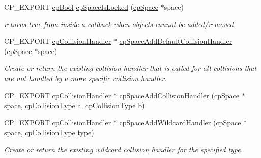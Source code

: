 \begin{DoxyCompactItemize}
\item 
\mbox{\label{group__cp_space_gad72c9085853f1d612226ec7b6faca362}} 
C\+P\+\_\+\+E\+X\+P\+O\+RT \mbox{\hyperlink{group__basic_types_gabc5e752c48f3449ca26ef413ecbd647e}{cp\+Bool}} \mbox{\hyperlink{group__cp_space_gad72c9085853f1d612226ec7b6faca362}{cp\+Space\+Is\+Locked}} (\mbox{\hyperlink{structcp_space}{cp\+Space}} $\ast$space)
\begin{DoxyCompactList}\small\item\em returns true from inside a callback when objects cannot be added/removed. \end{DoxyCompactList}\item 
\mbox{\label{group__cp_space_ga0ba809a2467c5e023738b9c5f72edda7}} 
C\+P\+\_\+\+E\+X\+P\+O\+RT \mbox{\hyperlink{structcp_collision_handler}{cp\+Collision\+Handler}} $\ast$ \mbox{\hyperlink{group__cp_space_ga0ba809a2467c5e023738b9c5f72edda7}{cp\+Space\+Add\+Default\+Collision\+Handler}} (\mbox{\hyperlink{structcp_space}{cp\+Space}} $\ast$space)
\begin{DoxyCompactList}\small\item\em Create or return the existing collision handler that is called for all collisions that are not handled by a more specific collision handler. \end{DoxyCompactList}\item 
C\+P\+\_\+\+E\+X\+P\+O\+RT \mbox{\hyperlink{structcp_collision_handler}{cp\+Collision\+Handler}} $\ast$ \mbox{\hyperlink{group__cp_space_ga54371fd2b5a430447dfc62826006a484}{cp\+Space\+Add\+Collision\+Handler}} (\mbox{\hyperlink{structcp_space}{cp\+Space}} $\ast$space, \mbox{\hyperlink{group__basic_types_gae83e2f50965eb441e36ffff1e32e6d02}{cp\+Collision\+Type}} a, \mbox{\hyperlink{group__basic_types_gae83e2f50965eb441e36ffff1e32e6d02}{cp\+Collision\+Type}} b)
\item 
\mbox{\label{group__cp_space_gaaa8df86dabe468bf5ab6e37dabeb6d90}} 
C\+P\+\_\+\+E\+X\+P\+O\+RT \mbox{\hyperlink{structcp_collision_handler}{cp\+Collision\+Handler}} $\ast$ \mbox{\hyperlink{group__cp_space_gaaa8df86dabe468bf5ab6e37dabeb6d90}{cp\+Space\+Add\+Wildcard\+Handler}} (\mbox{\hyperlink{structcp_space}{cp\+Space}} $\ast$space, \mbox{\hyperlink{group__basic_types_gae83e2f50965eb441e36ffff1e32e6d02}{cp\+Collision\+Type}} type)
\begin{DoxyCompactList}\small\item\em Create or return the existing wildcard collision handler for the specified type. \end{DoxyCompactList}\item 

\end{DoxyCompactItemize}
